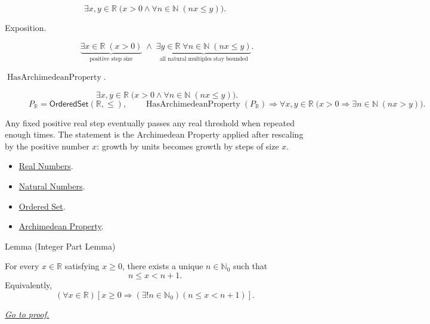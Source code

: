 \begin{remark*}
\[
\exists x,y\in\mathbb{R}\;\bigl(x>0\land \forall n\in\mathbb{N}\;(nx\le y)\bigr).
\]
\end{remark*}

\begin{remark*}
\begin{description}
  \item[Exposition.]
\[
\underbrace{\exists x\in\mathbb{R}\;(x>0)}_{\text{positive step size}}
\;\land\;
\underbrace{\exists y\in\mathbb{R}\;\forall n\in\mathbb{N}\;(nx\le y)}_{\text{all natural multiples stay bounded}}.
\]


  \item[\(\operatorname{HasArchimedeanProperty}.\)]
  \[
\exists x,y\in\mathbb{R}\;\bigl(x>0\land \forall n\in\mathbb{N}\;(nx\le y)\bigr).
\]
\[
P_{\mathbb{R}}=\mathsf{OrderedSet}(\mathbb{R},\leq),\qquad
\operatorname{HasArchimedeanProperty}(P_{\mathbb{R}})
\Longrightarrow
\forall x,y\in\mathbb{R}\;\bigl(x>0\Longrightarrow \exists n\in\mathbb{N}\;(nx>y)\bigr).
\]
\end{description}
\end{remark*}

\begin{remark*}[Interpretation]
Any fixed positive real step eventually passes any real threshold when repeated enough times. The statement is the Archimedean Property applied after rescaling by the positive number $x$: growth by units becomes growth by steps of size $x$.
\end{remark*}

\begin{dependencies}
\begin{itemize}
\item \hyperref[def:reals]{Real Numbers}.
\item \hyperref[def:natural-numbers]{Natural Numbers}.
\item \hyperref[def:ordered-set]{Ordered Set}.
\item \hyperref[thm:archimedean-property]{Archimedean Property}.
\end{itemize}
\end{dependencies}







\begin{lemmabox}{Lemma (Integer Part Lemma)}
\begin{lemma}
\label{lem:integer-part-lemma}
For every $x\in\mathbb{R}$ satisfying $x\geq0$, there exists a unique
$n\in\mathbb{N}_0$ such that
\[
  n\leq x<n+1.
\]
Equivalently,
\[
  (\forall x\in\mathbb{R})
  \left[x\geq0\Longrightarrow(\exists!n\in\mathbb{N}_0)(n\leq x<n+1)\right].
\]

\smallskip
\noindent
\hyperref[prf:integer-part-lemma]{\textit{Go to proof.}}
\end{lemma}
\end{lemmabox}

